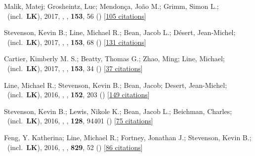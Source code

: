 \item[{\color{numcolor}\scriptsize13}] Malik, Matej; Grosheintz, Luc; Mendon{\c{c}}a, Jo{\~a}o M.; Grimm, Simon L.; \etal\ (incl.\ \textbf{LK}), 2017, , \aj, \textbf{153}, 56 () [\href{https://ui.adsabs.harvard.edu/abs/2017AJ....153...56M}{105 citations}]

\item[{\color{numcolor}\scriptsize12}] Stevenson, Kevin B.; Line, Michael R.; Bean, Jacob L.; D{\'e}sert, Jean-Michel; \etal\ (incl.\ \textbf{LK}), 2017, , \aj, \textbf{153}, 68 () [\href{https://ui.adsabs.harvard.edu/abs/2017AJ....153...68S}{131 citations}]

\item[{\color{numcolor}\scriptsize11}] Cartier, Kimberly M. S.; Beatty, Thomas G.; Zhao, Ming; Line, Michael; \etal\ (incl.\ \textbf{LK}), 2017, , \aj, \textbf{153}, 34 () [\href{https://ui.adsabs.harvard.edu/abs/2017AJ....153...34C}{37 citations}]

\item[{\color{numcolor}\scriptsize10}] Line, Michael R.; Stevenson, Kevin B.; Bean, Jacob; Desert, Jean-Michel; \etal\ (incl.\ \textbf{LK}), 2016, , \aj, \textbf{152}, 203 () [\href{https://ui.adsabs.harvard.edu/abs/2016AJ....152..203L}{149 citations}]

\item[{\color{numcolor}\scriptsize9}] Stevenson, Kevin B.; Lewis, Nikole K.; Bean, Jacob L.; Beichman, Charles; \etal\ (incl.\ \textbf{LK}), 2016, , \pasp, \textbf{128}, 94401 () [\href{https://ui.adsabs.harvard.edu/abs/2016PASP..128i4401S}{75 citations}]

\item[{\color{numcolor}\scriptsize8}] Feng, Y. Katherina; Line, Michael R.; Fortney, Jonathan J.; Stevenson, Kevin B.; \etal\ (incl.\ \textbf{LK}), 2016, , \apj, \textbf{829}, 52 () [\href{https://ui.adsabs.harvard.edu/abs/2016ApJ...829...52F}{86 citations}]

